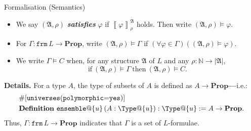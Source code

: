 \documentclass[serif,table,10pt]{beamer}
\newcommand{\IN}{\mathbb{N}}
\newcommand{\0}{\texttt{0}}
\newcommand{\1}{\texttt{1}}
\newcommand{\inlinedef}[1]{\emph{\textbf{#1}}}
\newcommand{\Prop}{\mathbf{Prop}}
\begin{document}
\begin{frame}{Formalisation (Semantics)}

    \begin{itemize}
        \item We say $ ( \mathfrak{ A } , \rho ) $ \inlinedef{satisfies} $ \varphi $ if $ \left\llbracket \varphi \right\rrbracket_\rho^\mathfrak{A} $ holds. Then write $( \mathfrak{ A } , \rho ) \models \varphi $.
        \item For $\Gamma : \mathtt{frm} \, L \to \Prop$, write $ ( \mathfrak{ A } , \rho ) \models \Gamma $ if $ (\forall \varphi \in \Gamma) ( ( \mathfrak{ A } , \rho ) \models \varphi ) $.
        \item We write $ \Gamma \vDash C $ when, for any structure $\mathfrak{A}$ of $L$ and any $\rho : \IN \to | \mathfrak{A} |$, \[ \mathrm{if} \  ( \mathfrak{ A } , \rho ) \models \Gamma \  \mathrm{then} \  ( \mathfrak{ A } , \rho ) \models C . \]
    \end{itemize}

    \textbf{Details.}
    For a type $A$, the type of subsets of $A$ is defined as $A \to \Prop$\textbf{---}i.e.:
    \begin{align*}
        & \mathtt{\#[universes(polymorphic\hbox{=}yes)]} \\
        & \mathbf{Definition} \  \mathtt{ensemble}@\{ u \} \, ( A : \Type@\{ u \}) : \Type@\{ u \} := A \to \Prop .
    \end{align*}
    Thus, $\Gamma : \mathtt{frm} \, L \to \Prop$ indicates that $\Gamma$ is a set of $L$-formulae.

\end{frame}
\end{document}
